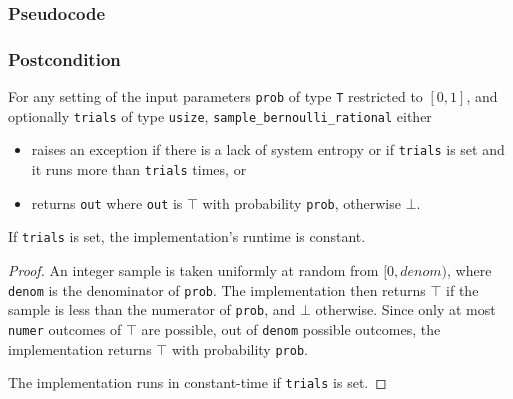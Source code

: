 \documentclass{article}
\begin{document}
\subsubsection*{Pseudocode}



\subsubsection*{Postcondition}
\begin{definition}
    \label{sample-bernoulli}

    For any setting of the input parameters
    \texttt{prob} of type \texttt{T} restricted to $[0, 1]$,
    and optionally \texttt{trials} of type \texttt{usize},
    \texttt{sample\_bernoulli\_rational} either
    \begin{itemize}
        \item raises an exception if there is a lack of system entropy or if \texttt{trials} is set and it runs more than \texttt{trials} times, or
        \item returns \texttt{out} where \texttt{out} is $\top$ with probability \texttt{prob}, otherwise $\bot$.
    \end{itemize}
     If \texttt{trials} is set, the implementation's runtime is constant.
\end{definition}

\begin{proof}
An integer sample is taken uniformly at random from $[0, denom)$, where \texttt{denom} is the denominator of \texttt{prob}.
The implementation then returns $\top$ if the sample is less than the numerator of \texttt{prob}, and $\bot$ otherwise.
Since only at most \texttt{numer} outcomes of $\top$ are possible, out of \texttt{denom} possible outcomes,
the implementation returns $\top$ with probability \texttt{prob}.

The implementation runs in constant-time if \texttt{trials} is set.
\end{proof}
\end{document}
